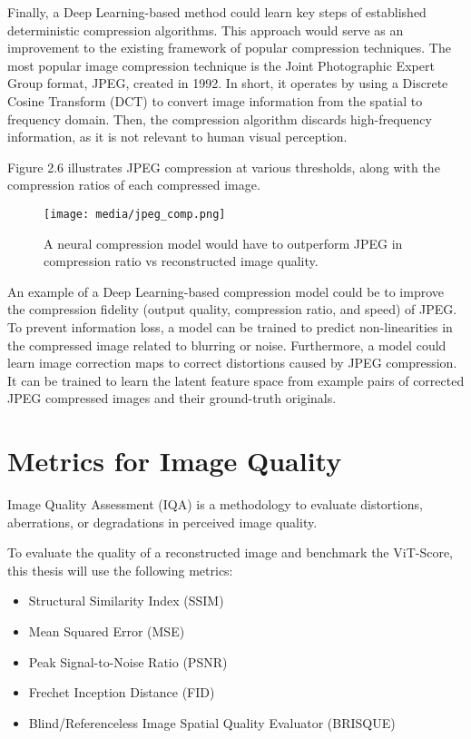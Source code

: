 Finally, a Deep Learning-based method could learn key steps of established deterministic compression algorithms.
This approach would serve as an improvement to the existing framework of popular compression techniques.
The most popular image compression technique is the Joint Photographic Expert Group format, JPEG, created in 1992. 
In short, it operates by using a Discrete Cosine Transform (DCT) to convert image information from the spatial to frequency domain. Then,
the compression algorithm discards high-frequency information, as it is not relevant to human visual perception. \citep{Principles}

Figure 2.6 illustrates JPEG compression at various thresholds, along with the compression ratios of each 
compressed image.
\begin{figure}[H]
	\begin{center}
	\texttt{[image: media/jpeg\_comp.png]}
	\end{center}
	\caption[JPEG Compression]{A neural compression model would have to 
    outperform JPEG in compression ratio vs reconstructed image quality. \citep{GANs}}
	\end{figure}
An example of a Deep Learning-based compression model could be to improve the compression fidelity (output quality, compression ratio, 
and speed) of JPEG. To prevent information loss, a model can be trained to predict non-linearities 
in the compressed image related to blurring or noise. Furthermore, a model could learn image correction maps to correct distortions 
caused by JPEG compression. 
It can be trained to learn the latent feature space from example pairs of corrected JPEG compressed images and
their ground-truth originals. 


\section{Metrics for Image Quality}

Image Quality Assessment (IQA) is a methodology to evaluate distortions, aberrations, or
degradations in perceived image quality.

To evaluate the quality of a reconstructed image and benchmark the ViT-Score,
this thesis will use the following metrics:

\begin{itemize}
	\item Structural Similarity Index (SSIM)
	\item Mean Squared Error (MSE)
    \item Peak Signal-to-Noise Ratio (PSNR)
	\item Frechet Inception Distance (FID)
	\item Blind/Referenceless Image Spatial Quality Evaluator (BRISQUE)
\end{itemize}

